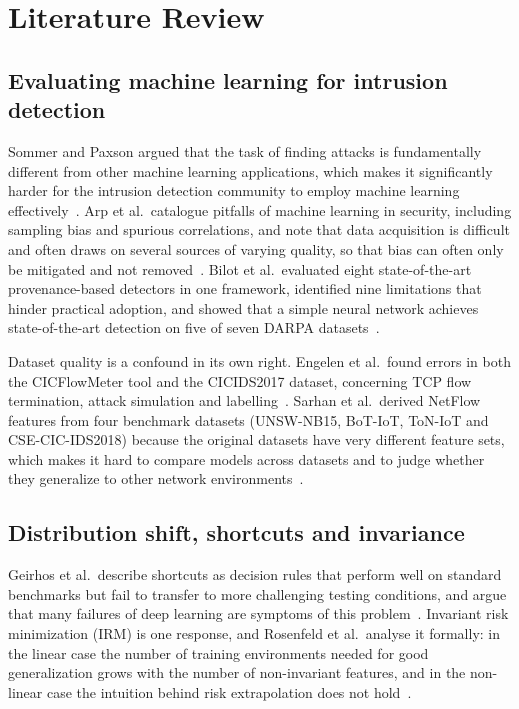 \documentclass[a4paper,10pt]{article}
\begin{document}
\section{Literature Review}
\label{sec:litreview}

\subsection{Evaluating machine learning for intrusion detection}

Sommer and Paxson argued that the task of finding attacks is fundamentally different from other machine learning applications, which makes it significantly harder for the intrusion detection community to employ machine learning effectively~\cite{sommer2010closed}. Arp et al.\ catalogue pitfalls of machine learning in security, including sampling bias and spurious correlations, and note that data acquisition is difficult and often draws on several sources of varying quality, so that bias can often only be mitigated and not removed~\cite{arp2022dos}. Bilot et al.\ evaluated eight state-of-the-art provenance-based detectors in one framework, identified nine limitations that hinder practical adoption, and showed that a simple neural network achieves state-of-the-art detection on five of seven DARPA datasets~\cite{bilot2025simpler}.

Dataset quality is a confound in its own right. Engelen et al.\ found errors in both the CICFlowMeter tool and the CICIDS2017 dataset, concerning TCP flow termination, attack simulation and labelling~\cite{engelen2021cicids}. Sarhan et al.\ derived NetFlow features from four benchmark datasets (UNSW-NB15, BoT-IoT, ToN-IoT and CSE-CIC-IDS2018) because the original datasets have very different feature sets, which makes it hard to compare models across datasets and to judge whether they generalize to other network environments~\cite{sarhan2021netflow}.

\subsection{Distribution shift, shortcuts and invariance}

Geirhos et al.\ describe shortcuts as decision rules that perform well on standard benchmarks but fail to transfer to more challenging testing conditions, and argue that many failures of deep learning are symptoms of this problem~\cite{geirhos2020shortcut}. Invariant risk minimization (IRM) is one response, and Rosenfeld et al.\ analyse it formally: in the linear case the number of training environments needed for good generalization grows with the number of non-invariant features, and in the non-linear case the intuition behind risk extrapolation does not hold~\cite{rosenfeld2021risks}.
\end{document}
